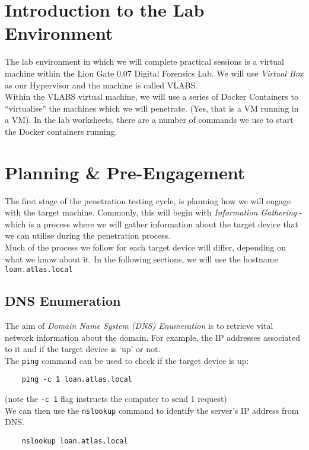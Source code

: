 
\section{Introduction to the Lab Environment}
The lab environment in which we will complete practical sessions is a virtual machine within the Lion Gate 0.07 Digital Forensics Lab. We will use \textit{Virtual Box} as our Hypervisor and the machine is called VLABS.\\

Within the VLABS virtual machine, we will use a series of Docker Containers to ``virtualise'' the machines which we will penetrate. (Yes, that is a VM running in a VM). In the lab worksheets, there are a number of commands we use to start the Docker containers running.

\section{Planning \& Pre-Engagement}
The first stage of the penetration testing cycle, is planning how we will engage with the target machine. Commonly, this will begin with \textit{Information Gathering} - which is a process where we will gather information about the target device that we can utilise during the penetration process.\\

Much of the process we follow for each target device will differ, depending on what we know about it. In the following sections, we will use the hostname \verb|loan.atlas.local|

\subsection{DNS Enumeration}
The aim of \textit{Domain Name System (DNS) Enumeration} is to retrieve vital network information about the domain. For example, the IP addresses associated to it and if the target device is `up' or not.\\

The \verb|ping| command can be used to check if the target device is up:
\begin{verbatim}
    ping -c 1 loan.atlas.local
\end{verbatim}
(note the \verb|-c 1| flag instructs the computer to send 1 request)\\

We can then use the \verb|nslookup| command to identify the server's IP address from DNS.
\begin{verbatim}
    nslookup loan.atlas.local
\end{verbatim}

